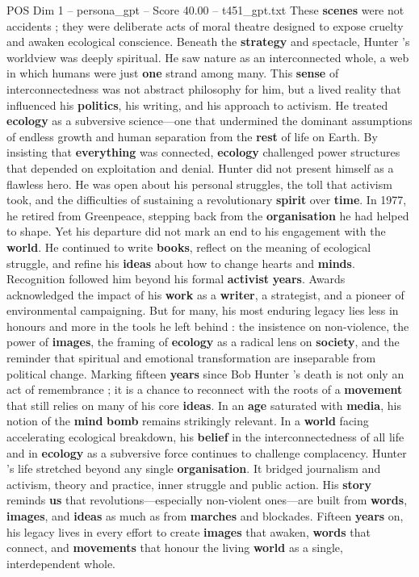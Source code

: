 \begin{textsample}{POS Dim 1 – persona\_gpt – Score 40.00 – t451\_gpt.txt}
These \textbf{scenes} were not accidents ; they were deliberate acts of moral theatre designed to expose cruelty and awaken ecological conscience.
Beneath the \textbf{strategy} and spectacle, Hunter ’s worldview was deeply spiritual.
He saw nature as an interconnected whole, a web in which humans were just \textbf{one} strand among many.
This \textbf{sense} of interconnectedness was not abstract philosophy for him, but a lived reality that influenced his \textbf{politics}, his writing, and his approach to activism.
He treated \textbf{ecology} as a subversive science—one that undermined the dominant assumptions of endless growth and human separation from the \textbf{rest} of life on Earth.
By insisting that \textbf{everything} was connected, \textbf{ecology} challenged power structures that depended on exploitation and denial.
Hunter did not present himself as a flawless hero.
He was open about his personal struggles, the toll that activism took, and the difficulties of sustaining a revolutionary \textbf{spirit} over \textbf{time}.
In 1977, he retired from Greenpeace, stepping back from the \textbf{organisation} he had helped to shape.
Yet his departure did not mark an end to his engagement with the \textbf{world}.
He continued to write \textbf{books}, reflect on the meaning of ecological struggle, and refine his \textbf{ideas} about how to change hearts and \textbf{minds}.
Recognition followed him beyond his formal \textbf{activist} \textbf{years}.
Awards acknowledged the impact of his \textbf{work} as a \textbf{writer}, a strategist, and a pioneer of environmental campaigning.
But for many, his most enduring legacy lies less in honours and more in the tools he left behind : the insistence on non-violence, the power of \textbf{images}, the framing of \textbf{ecology} as a radical lens on \textbf{society}, and the reminder that spiritual and emotional transformation are inseparable from political change.
Marking fifteen \textbf{years} since Bob Hunter ’s death is not only an act of remembrance ; it is a chance to reconnect with the roots of a \textbf{movement} that still relies on many of his core \textbf{ideas}.
In an \textbf{age} saturated with \textbf{media}, his notion of the \textbf{mind} \textbf{bomb} remains strikingly relevant.
In a \textbf{world} facing accelerating ecological breakdown, his \textbf{belief} in the interconnectedness of all life and in \textbf{ecology} as a subversive force continues to challenge complacency.
Hunter ’s life stretched beyond any single \textbf{organisation}.
It bridged journalism and activism, theory and practice, inner struggle and public action.
His \textbf{story} reminds \textbf{us} that revolutions—especially non-violent ones—are built from \textbf{words}, \textbf{images}, and \textbf{ideas} as much as from \textbf{marches} and blockades.
Fifteen \textbf{years} on, his legacy lives in every effort to create \textbf{images} that awaken, \textbf{words} that connect, and \textbf{movements} that honour the living \textbf{world} as a single, interdependent whole.


\end{textsample}
